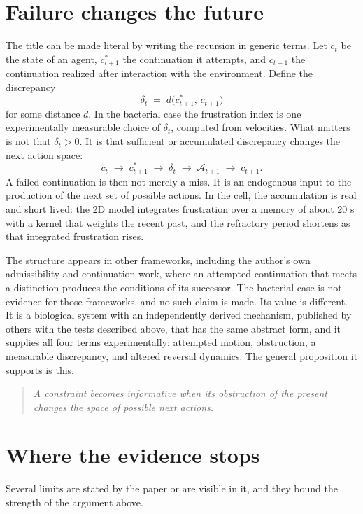 \documentclass[11pt]{article}
\theoremstyle{definition}
\theoremstyle{remark}
\newcommand{\A}{\mathcal{A}}
\begin{document}
\section{Failure changes the future}

The title can be made literal by writing the recursion in generic terms. Let $c_t$ be the state of an agent, $c^{*}_{t+1}$ the continuation it attempts, and $c_{t+1}$ the continuation realized after interaction with the environment. Define the discrepancy
\[
  \delta_t \;=\; d\big(c^{*}_{t+1},\,c_{t+1}\big)
\]
for some distance $d$. In the bacterial case the frustration index is one experimentally measurable choice of $\delta_t$, computed from velocities. What matters is not that $\delta_t>0$. It is that sufficient or accumulated discrepancy changes the next action space:
\[
  c_t \;\to\; c^{*}_{t+1} \;\to\; \delta_t \;\to\; \A_{t+1} \;\to\; c_{t+1}.
\]
A failed continuation is then not merely a miss. It is an endogenous input to the production of the next set of possible actions. In the cell, the accumulation is real and short lived: the 2D model integrates frustration over a memory of about 20 s with a kernel that weights the recent past, and the refractory period shortens as that integrated frustration rises.

The structure appears in other frameworks, including the author's own admissibility and continuation work, where an attempted continuation that meets a distinction produces the conditions of its successor. The bacterial case is not evidence for those frameworks, and no such claim is made. Its value is different. It is a biological system with an independently derived mechanism, published by others with the tests described above, that has the same abstract form, and it supplies all four terms experimentally: attempted motion, obstruction, a measurable discrepancy, and altered reversal dynamics. The general proposition it supports is this.

\begin{quote}
\emph{A constraint becomes informative when its obstruction of the present changes the space of possible next actions.}
\end{quote}

\section{Where the evidence stops}

Several limits are stated by the paper or are visible in it, and they bound the strength of the argument above.
\end{document}
